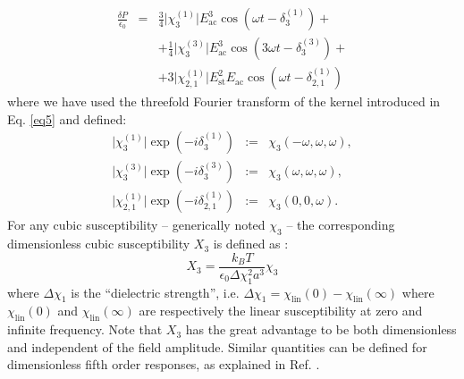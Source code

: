 \documentclass[single column,pre]{revtex4}
\begin{document}
\begin{eqnarray}
\frac{\delta P}{\epsilon_0} &=& \frac{3}{4} \vert \chi_{3}^{(1)}\vert E_{\text{ac}}^3\cos{(\omega t - \delta_{3}^{(1)})} + \nonumber \\
\ &\ & + \frac{1}{4} \vert \chi_{3}^{(3)}\vert E_{\text{ac}}^3\cos{(3 \omega t - \delta_{3}^{(3)})} + \nonumber \\
\ &\ & + 3 \vert \chi_{2,1}^{(1)}\vert E_{\text{st}}^2 E_{\text{ac}}\cos{(\omega t - \delta_{2,1}^{(1)})}
\label{eq19}
\end{eqnarray} 
where we have used the threefold Fourier transform of the kernel introduced in Eq. \ref{eq5} and defined:
\begin{eqnarray}
\vert \chi_{3}^{(1)}\vert  \exp{(-i \delta_{3}^{(1)})} &:=& \chi_3(-\omega, \omega,\omega),\nonumber \\
\vert \chi_{3}^{(3)}\vert  \exp{(-i \delta_{3}^{(3)})} &:=& \chi_3(\omega, \omega,\omega),\nonumber \\
\vert \chi_{2,1}^{(1)}\vert  \exp{(-i \delta_{2,1}^{(1)})} &:=& \chi_3(0,0,\omega).
\end{eqnarray}
For any cubic susceptibility -- generically noted $\chi_3$ -- the corresponding dimensionless cubic susceptibility $X_3$ is defined as :
\begin{equation}
X_3 = \frac{k_B T}{\epsilon_0 \Delta \chi_1^2 a^3} \chi_3
\label{eq8}
\end{equation}
where $\Delta \chi_1$ is the ``dielectric strength'', i.e. $\Delta \chi_1 = \chi_{\text{lin}}(0) - \chi_{\text{lin}}(\infty)$ where $\chi_{\text{lin}}(0)$ and  $\chi_{\text{lin}}(\infty)$ are respectively the linear susceptibility at zero and infinite frequency. Note that $X_3$ has the great advantage to be both dimensionless and independent of the field amplitude. Similar quantities can be defined for dimensionless fifth order responses, as explained in Ref. \cite{Alb16}.
\end{document}

